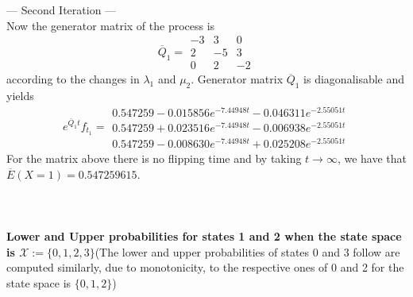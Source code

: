 \documentclass{article}
\newcommand{\statessymbol}{\mathcal{X}}
\newcommand{\stateset}{\statessymbol}
\begin{document}
--- Second Iteration ---\\
Now the generator matrix of the process is
\begin{equation*} 
 \overline{Q}_{1}= 
 \begin{array}{|rrr|}
  -3 & 3 & 0 \\
  2 & -5 & 3 \\
  0 & 2 & -2 
 \end{array}
 \end{equation*}
according to the changes in $\lambda_{1}$ and $\mu_{2}$.
Generator matrix $\overline{Q}_1$ is diagonalisable and yields 
\begin{equation*} 
 e^{\overline{Q}_{1}t}f_{t_1}= 
 \begin{array}{|r|}
 0.547259-0.015856e^{-7.44948t}-0.046311e^{-2.55051t}\\
 0.547259+0.023516e^{-7.44948t}-0.006938e^{-2.55051t}\\
 0.547259-0.008630e^{-7.44948t}+0.025208e^{-2.55051t}
 \end{array}
 \end{equation*}
For the matrix above there is no flipping time and by taking $t\to\infty$, we have that
$\overline{E}(X=1) = 0.547259615$.\\\\\\\\
\textbf{Lower and Upper probabilities for states 1 and 2 when the state space is $\stateset:=\{0,1,2,3\}$}(The lower and upper probabilities of states 0 and 3 follow are computed similarly, due to monotonicity, to the respective ones of 0 and 2 for the state space is $\{0,1,2\}$)\\





\end{document}
